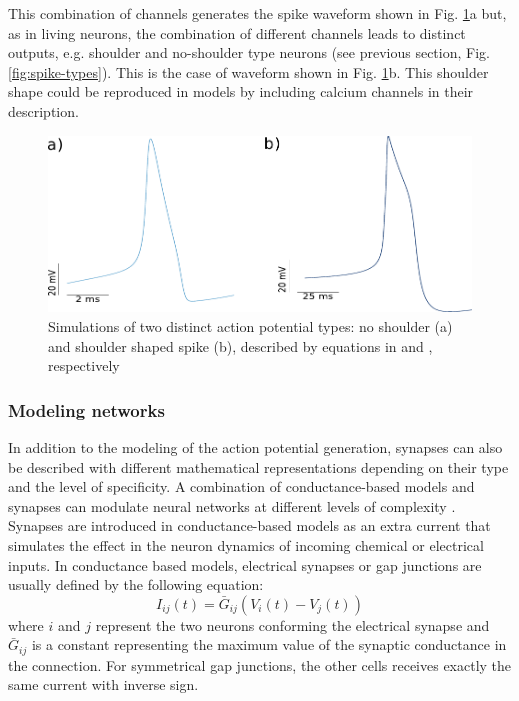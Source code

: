 This combination of channels generates the spike waveform shown in Fig. \ref{fig:spike-types model}a but, as in living neurons, the combination of different channels leads to distinct outputs, e.g. shoulder and no-shoulder type neurons (see previous section, Fig. \ref{fig:spike-types}). This is the case of waveform shown in Fig. \ref{fig:spike-types model}b. This shoulder shape could be reproduced in models by including calcium channels in their description.

\begin{figure}[htb!]
	\includegraphics[width=\textwidth]{img/intro/spike-types model.pdf}
	\caption{Simulations of two distinct action potential types: no shoulder (a) and shoulder shaped spike (b), described by equations in \textcite{hodgkin_quantitative_1952} and \textcite{vavoulis_balanced_2010}, respectively}
	\label{fig:spike-types model}
\end{figure}

\subsubsection{\large{Modeling networks}}
\label{c-intro-synapses}
In addition to the modeling of the action potential generation, synapses can also be described with different mathematical representations depending on their type and the level of specificity. A combination of conductance-based models and synapses can modulate neural networks at different levels of complexity \parencite{aguirre_pattern_2007,latorre_transient_2013,huerta_topology_2001}. Synapses are introduced in conductance-based models as an extra current that simulates the effect in the neuron dynamics of incoming chemical or electrical inputs. In conductance based models, electrical synapses or gap junctions are usually defined by the following equation:
\begin{equation}
    I_{ij}(t) = \bar{G}_{ij} (V_i(t) - V_j(t))
\end{equation}
\noindent where $i$ and $j$ represent the two neurons conforming the electrical synapse and $\bar{G}_{ij}$ is a constant representing the maximum value of the  synaptic conductance in the connection. For symmetrical gap junctions, the other cells receives exactly the same current with inverse sign.

